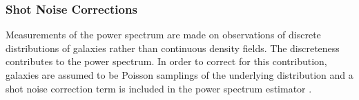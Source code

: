 
                                                                                                                                                                                                                                                                      \subsubsection{Shot Noise Corrections} \label{sec:shotnoise} 
                                                                                                                                                                                                                                                                      Measurements of the power spectrum are made on observations of discrete 
                                                                                                                                                                                                                                                                      distributions of galaxies rather than continuous density fields. The 
                                                                                                                                                                                                                                                                      discreteness contributes to the power spectrum. In order to correct for 
                                                                                                                                                                                                                                                                      this contribution, galaxies are assumed to be Poisson samplings of the 
                                                                                                                                                                                                                                                                      underlying distribution and a shot noise correction term 
                                                                                                                                                                                                                                                                      is included in the power spectrum estimator \citep{Peebles:1980aa, Feldman:1994aa}. 

